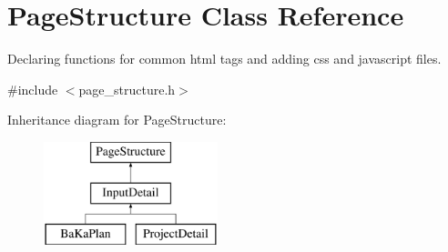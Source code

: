 \hypertarget{classPageStructure}{\section{Page\-Structure Class Reference}
\label{classPageStructure}
}


Declaring functions for common html tags and adding css and javascript files.  




{\ttfamily \#include $<$page\-\_\-structure.\-h$>$}

Inheritance diagram for Page\-Structure\-:\begin{figure}[H]
\begin{center}
\leavevmode
\includegraphics[height=3.000000cm]{classPageStructure}
\end{center}
\end{figure}
